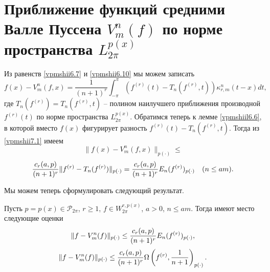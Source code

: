 \section{Приближение функций средними Валле Пуссена $V_m^n(f)$ по норме пространства $ L^{p(x)}_{2\pi}$  }\label{vpmshiis7}

Из равенств \eqref{vpmshii6.7} и  \eqref{vpmshii6.10} мы можем записать
\begin{equation}\label{vpmshii7.1}
  f(x)-V_m^n(f,x)= \frac{1}{(n+1)^r}\int_{-\pi}^\pi (f^{(r)}(t)-T_n(f^{(r)},t))\kappa_{r,m}^n(t-x)dt,
\end{equation}
где $T_n(f^{(r)})=T_n(f^{(r)},t)$ -- полином наилучшего приближения производной  $f^{(r)}(t)$ по норме пространства
 $L^{p(x)}_{2\pi}$. Обратимся теперь к лемме \ref{vpmshiil6.6}, в которой вместо $f(x)$ фигурирует разность $f^{(r)}(t)-T_n(f^{(r)},t)$. Тогда из \eqref{vpmshii7.1} имеем
 $$
 \|f(x)-V_m^n(f,x)\|_{p(\cdot)}\le
  $$
 \begin{equation}\label{vpmshii7.2}
  {c_r(a,p)\over (n+1)^r}\|f^{(r)}-T_n(f^{(r)})\|_{p(\cdot)}={c_r(a,p)\over (n+1)^r}E_n(f^{(r)})_{p(\cdot)} \quad (n\le am) .
 \end{equation}

Мы можем теперь сформулировать следующий результат.
\begin{theorem}\label{vpmshiit2}
Пусть  $p=p(x)\in\mathcal{  P}_{2\pi}$, $r\ge1$, $f\in W^{r,p(x)}_{2\pi}$, $a>0$, $n\le am$. Тогда имеют место следующие оценки
\begin{equation}\label{vpmshii7.3}
   \|f-V_m^n(f)\|_{p(\cdot)}\le {c_r(a,p)\over (n+1)^r}E_n(f^{(r)})_{p(\cdot)},
\end{equation}
\begin{equation}\label{vpmshii7.4}
   \|f-V_m^n(f)\|_{p(\cdot)}\le {c_r(a,p)\over (n+1)^r}\Omega\left(f^{(r)},\frac1{n+1}\right)_{p(\cdot)}.
\end{equation}
\end{theorem}

